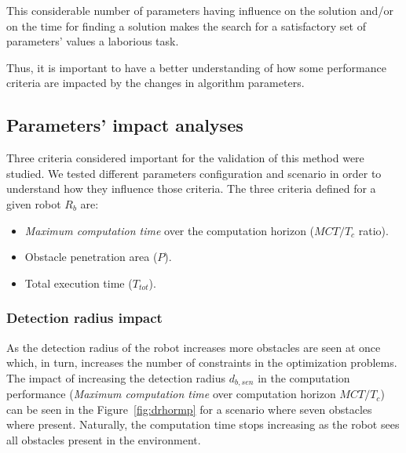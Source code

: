 \documentclass[eprint]{actapoly}
\begin{document}
This considerable number of parameters having influence on the solution
and/or on the time for finding a solution makes the search for a
satisfactory set of parameters' values a laborious task.

Thus, it is important to have a better understanding of how some
performance criteria are impacted by the changes in algorithm
parameters.

\subsection{Parameters' impact analyses}

Three criteria considered important for the validation of this method were studied.
We tested different parameters configuration and scenario in order to 
understand how they influence
those criteria.
The three criteria defined for a given robot $R_b$ are:

\begin{itemize}

\item
\textit{Maximum computation time} over the computation horizon ($MCT/T_c$ 
ratio).

\item
Obstacle penetration area ($P$).

\item
Total execution time ($T_{tot}$).

\end{itemize}

\subsubsection{Detection radius impact}

As the detection radius of the robot increases more obstacles are
seen at once which, in turn,
increases the number of constraints in the optimization problems.
The impact of increasing the detection radius $d_{b,sen}$ in the computation
performance (\textit{Maximum computation time} over computation horizon $MCT/T_c$) can
be seen in the Figure~\ref{fig:drhormp} for a scenario where seven obstacles where present.
Naturally, the computation time stops increasing as the robot sees all obstacles present
in the environment.
\end{document}
